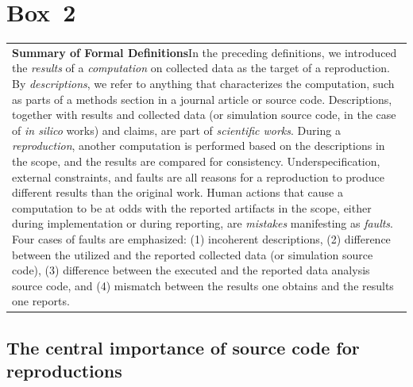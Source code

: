 \documentclass[authordate, empirical]{jote-new-article}
\begin{document}
	\section{\textbf{Box 2}}

	\begin{table}
		\begin{tabularx}{\linewidth}{@{} l @{}}
			\hline \textbf{Summary of Formal Definitions}In the preceding definitions, we introduced the \emph{results} of a \emph{computation} on collected data as the target of a reproduction. By \emph{descriptions}, we refer to anything that characterizes the computation, such as parts of a methods section in a journal article or source code. Descriptions, together with results and collected data (or simulation source code, in the case of \emph{in silico} works) and claims, are part of \emph{scientific works}. During a \emph{reproduction}, another computation is performed based on the descriptions in the scope, and the results are compared for consistency. Underspecification, external constraints, and faults are all reasons for a reproduction to produce different results than the original work. Human actions that cause a computation to be at odds with the reported artifacts in the scope, either during implementation or during reporting, are \emph{mistakes} manifesting as \emph{faults}. Four cases of faults are emphasized: (1) incoherent descriptions, (2) difference between the utilized and the reported collected data (or simulation source code), (3) difference between the executed and the reported data analysis source code, and (4) mismatch between the results one obtains and the results one reports.
			\\


		\end{tabularx}
	\end{table}

	\subsection{The central importance of source code for reproductions}
\end{document}
